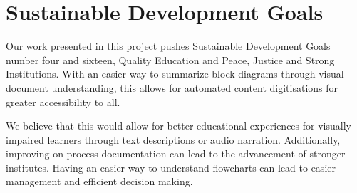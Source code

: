 \section{Sustainable Development Goals}

Our work presented in this project pushes Sustainable Development Goals number four and sixteen, Quality Education and Peace, Justice and Strong Institutions. With an easier way to summarize block diagrams through visual document understanding, this allows for automated content digitisations for greater accessibility to all. 

We believe that this would allow for better educational experiences for visually impaired learners through text descriptions or audio narration. Additionally, improving on process documentation can lead to the advancement of stronger institutes. Having an easier way to understand flowcharts can lead to easier management and efficient decision making. 
